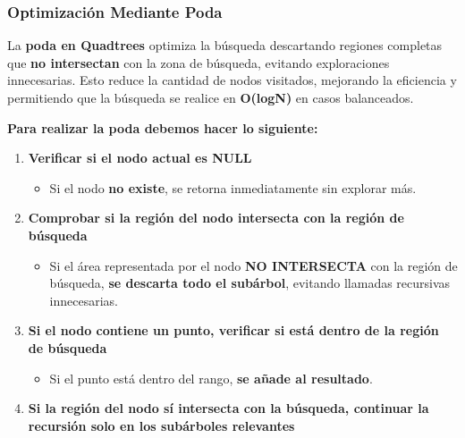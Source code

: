 \documentclass[9pt,a4paper,twoside]{rho-class/rho}
\begin{document}
            \subsubsection{Optimización Mediante Poda}
                La \textbf{poda en Quadtrees} optimiza la búsqueda descartando regiones completas que \textbf{no intersectan} con la zona de búsqueda, evitando exploraciones innecesarias. Esto reduce la cantidad de nodos visitados, mejorando la eficiencia y permitiendo que la búsqueda se realice en \textbf{O(logN)} en casos balanceados.

                \textbf{Para realizar la poda debemos hacer lo siguiente:}
                \begin{enumerate}
                    \item \textbf{Verificar si el nodo actual es NULL}
                    \begin{itemize}
                        \item Si el nodo \textbf{no existe}, se retorna inmediatamente sin explorar más.
                    \end{itemize}
                    
                    \item \textbf{Comprobar si la región del nodo intersecta con la región de búsqueda}
                    \begin{itemize}
                        \item Si el área representada por el nodo \textbf{NO INTERSECTA} con la región de búsqueda, \textbf{se descarta todo el subárbol}, evitando llamadas recursivas innecesarias.
                    \end{itemize}
                    
                    \item \textbf{Si el nodo contiene un punto, verificar si está dentro de la región de búsqueda}
                    \begin{itemize}
                        \item Si el punto está dentro del rango, \textbf{se añade al resultado}.
                    \end{itemize}
                    
                    \item \textbf{Si la región del nodo sí intersecta con la búsqueda, continuar la recursión solo en los subárboles relevantes}
                \end{enumerate}
\end{document}
